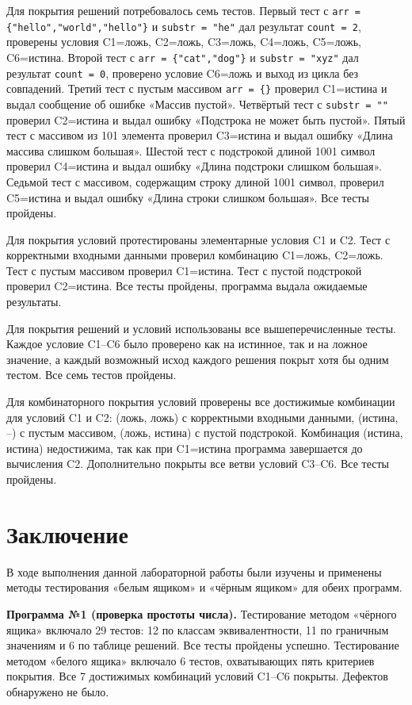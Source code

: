 \documentclass{article}[14pt]
\begin{document}
Для покрытия решений потребовалось семь тестов. Первый тест с \texttt{arr = \{"hello","world","hello"\}} и \texttt{substr = "he"} дал результат \texttt{count = 2}, проверены условия C1=ложь, C2=ложь, C3=ложь, C4=ложь, C5=ложь, C6=истина. Второй тест с \texttt{arr = \{"cat","dog"\}} и \texttt{substr = "xyz"} дал результат \texttt{count = 0}, проверено условие C6=ложь и выход из цикла без совпадений. Третий тест с пустым массивом \texttt{arr = \{\}} проверил C1=истина и выдал сообщение об ошибке «Массив пустой». Четвёртый тест с \texttt{substr = ""} проверил C2=истина и выдал ошибку «Подстрока не может быть пустой». Пятый тест с массивом из 101 элемента проверил C3=истина и выдал ошибку «Длина массива слишком большая». Шестой тест с подстрокой длиной 1001 символ проверил C4=истина и выдал ошибку «Длина подстроки слишком большая». Седьмой тест с массивом, содержащим строку длиной 1001 символ, проверил C5=истина и выдал ошибку «Длина строки слишком большая». Все тесты пройдены.

Для покрытия условий протестированы элементарные условия C1 и C2. Тест с корректными входными данными проверил комбинацию C1=ложь, C2=ложь. Тест с пустым массивом проверил C1=истина. Тест с пустой подстрокой проверил C2=истина. Все тесты пройдены, программа выдала ожидаемые результаты.

Для покрытия решений и условий использованы все вышеперечисленные тесты. Каждое условие C1–C6 было проверено как на истинное, так и на ложное значение, а каждый возможный исход каждого решения покрыт хотя бы одним тестом. Все семь тестов пройдены.

Для комбинаторного покрытия условий проверены все достижимые комбинации для условий C1 и C2: (ложь, ложь) с корректными входными данными, (истина, --) с пустым массивом, (ложь, истина) с пустой подстрокой. Комбинация (истина, истина) недостижима, так как при C1=истина программа завершается до вычисления C2. Дополнительно покрыты все ветви условий C3–C6. Все тесты пройдены.

\pagebreak

\section{Заключение}

В ходе выполнения данной лабораторной работы были изучены и применены методы тестирования
«белым ящиком» и «чёрным ящиком» для обеих программ.

\textbf{Программа №1 (проверка простоты числа).}
Тестирование методом «чёрного ящика» включало 29 тестов: 12 по классам эквивалентности,
11 по граничным значениям и 6 по таблице решений. Все тесты пройдены успешно.
Тестирование методом «белого ящика» включало 6 тестов, охватывающих пять критериев покрытия. 
Все 7 достижимых комбинаций условий C1--C6 покрыты. Дефектов обнаружено не было.
\end{document}
